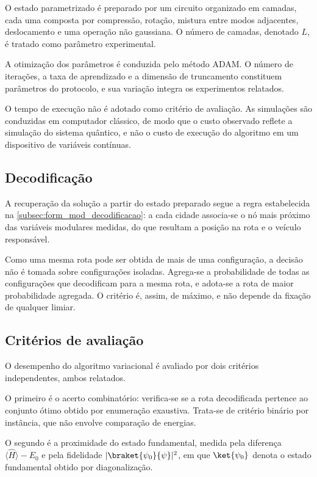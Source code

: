         O estado parametrizado é preparado por um circuito organizado em camadas, cada uma composta por compressão, rotação, mistura entre modos adjacentes, deslocamento e uma operação não gaussiana. O número de camadas, denotado $L$, é tratado como parâmetro experimental.

        A otimização dos parâmetros é conduzida pelo método ADAM. O número de iterações, a taxa de aprendizado e a dimensão de truncamento constituem parâmetros do protocolo, e sua variação integra os experimentos relatados.

        O tempo de execução não é adotado como critério de avaliação. As simulações são conduzidas em computador clássico, de modo que o custo observado reflete a simulação do sistema quântico, e não o custo de execução do algoritmo em um dispositivo de variáveis contínuas.

    \subsection{Decodificação}\label{subsec:met_decodificacao}

        A recuperação da solução a partir do estado preparado segue a regra estabelecida na \autoref{subsec:form_mod_decodificacao}: a cada cidade associa-se o nó mais próximo das variáveis modulares medidas, do que resultam a posição na rota e o veículo responsável.

        Como uma mesma rota pode ser obtida de mais de uma configuração, a decisão não é tomada sobre configurações isoladas. Agrega-se a probabilidade de todas as configurações que decodificam para a mesma rota, e adota-se a rota de maior probabilidade agregada. O critério é, assim, de máximo, e não depende da fixação de qualquer limiar.

    \subsection{Critérios de avaliação}\label{subsec:met_criterios}

        O desempenho do algoritmo variacional é avaliado por dois critérios independentes, ambos relatados.

        O primeiro é o acerto combinatório: verifica-se se a rota decodificada pertence ao conjunto ótimo obtido por enumeração exaustiva. Trata-se de critério binário por instância, que não envolve comparação de energias.

        O segundo é a proximidade do estado fundamental, medida pela diferença $\langle \hat{H} \rangle - E_0$ e pela fidelidade $|\braket{\psi_0}{\psi}|^2$, em que $\ket{\psi_0}$ denota o estado fundamental obtido por diagonalização.

